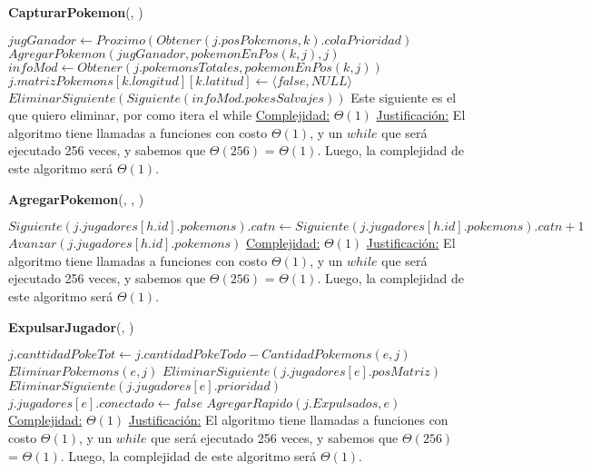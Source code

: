 \begin{algorithm}[H]{\textbf{CapturarPokemon}(, )} 
    \begin{algorithmic}[1]
            \State $jugGanador \gets Proximo(Obtener(j.posPokemons, k).colaPrioridad)$
            \State $AgregarPokemon(jugGanador, pokemonEnPos(k,j), j)$
            \State $infoMod \gets Obtener(j.pokemonsTotales, pokemonEnPos(k,j))$
            \State $j.matrizPokemons[k.longitud][k.latitud] \gets \langle false, NULL \rangle$
            \State $EliminarSiguiente(Siguiente(infoMod.pokesSalvajes))$ \Comment Este siguiente es el que quiero eliminar, por como itera el while
        \EndIf
        \medskip
        \Statex \underline{Complejidad:} $\Theta(1)$
        \Statex \underline{Justificación:}  El algoritmo tiene llamadas a funciones con costo $\Theta(1)$, y un $while$ que será ejecutado 256 veces, y sabemos que $\Theta (256)$ = $\Theta (1)$. Luego, la complejidad de este algoritmo será $\Theta (1)$.
    \end{algorithmic}
\end{algorithm} 

\begin{algorithm}[H]{\textbf{AgregarPokemon}(, , )}   
    \begin{algorithmic}[1]
                \State $Siguiente(j.jugadores[h.id].pokemons).catn \gets Siguiente(j.jugadores[h.id].pokemons).catn + 1$
            \EndIf
            \State $Avanzar(j.jugadores[h.id].pokemons)$
        \EndWhile
        \medskip
        \Statex \underline{Complejidad:} $\Theta(1)$
        \Statex \underline{Justificación:}  El algoritmo tiene llamadas a funciones con costo $\Theta(1)$, y un $while$ que será ejecutado 256 veces, y sabemos que $\Theta (256)$ = $\Theta (1)$. Luego, la complejidad de este algoritmo será $\Theta (1)$.
    \end{algorithmic}
\end{algorithm} 


\begin{algorithm}[H]{\textbf{ExpulsarJugador}(, )}   
    \begin{algorithmic}[1]
        \State $j.canttidadPokeTot \gets j.cantidadPokeTodo - CantidadPokemons(e,j)$
        \State $EliminarPokemons(e,j)$
        \State $EliminarSiguiente(j.jugadores[e].posMatriz)$
        \State $EliminarSiguiente(j.jugadores[e].prioridad)$
        \State $j.jugadores[e].conectado \gets false$
        \State $AgregarRapido(j.Expulsados, e)$
        \medskip
        \Statex \underline{Complejidad:} $\Theta(1)$
        \Statex \underline{Justificación:}  El algoritmo tiene llamadas a funciones con costo $\Theta(1)$, y un $while$ que será ejecutado 256 veces, y sabemos que $\Theta (256)$ = $\Theta (1)$. Luego, la complejidad de este algoritmo será $\Theta (1)$.
    \end{algorithmic}
\end{algorithm} 

